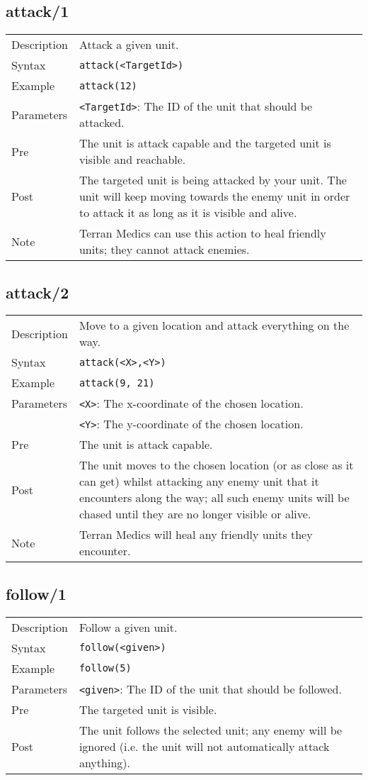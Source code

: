 \subsection{attack/1}
\begin{tabularx}{\textwidth}{lX}
 Description & Attack a given unit. \\
 Syntax & \verb|attack(<TargetId>)| \\
 Example & \verb|attack(12)| \\
 Parameters & \verb|<TargetId>|: The ID of the unit that should be attacked. \\
 Pre & The unit is attack capable and the targeted unit is visible and reachable. \\
 Post & The targeted unit is being attacked by your unit. The unit will keep moving towards the enemy unit in order to attack it as long as it is visible and alive. \\
 Note & Terran Medics can use this action to heal friendly units; they cannot attack enemies.
\end{tabularx}

\subsection{attack/2}
\begin{tabularx}{\textwidth}{lX}
 Description & Move to a given location and attack everything on the way. \\
 Syntax & \verb|attack(<X>,<Y>)| \\
 Example & \verb|attack(9, 21)| \\
 Parameters & \verb|<X>|: The x-coordinate of the chosen location. \\
            & \verb|<Y>|: The y-coordinate of the chosen location. \\
 Pre & The unit is attack capable. \\
 Post & The unit moves to the chosen location (or as close as it can get) whilst attacking any enemy unit that it encounters along the way; all such enemy units will be chased until they are no longer visible or alive. \\
 Note & Terran Medics will heal any friendly units they encounter.
\end{tabularx}

\subsection{follow/1}
\begin{tabularx}{\textwidth}{lX}
 Description & Follow a given unit. \\
 Syntax & \verb|follow(<given>)| \\
 Example & \verb|follow(5)| \\
 Parameters & \verb|<given>|: The ID of the unit that should be followed. \\
 Pre & The targeted unit is visible. \\
 Post & The unit follows the selected unit; any enemy will be ignored (i.e. the unit will not automatically attack anything).
\end{tabularx}

